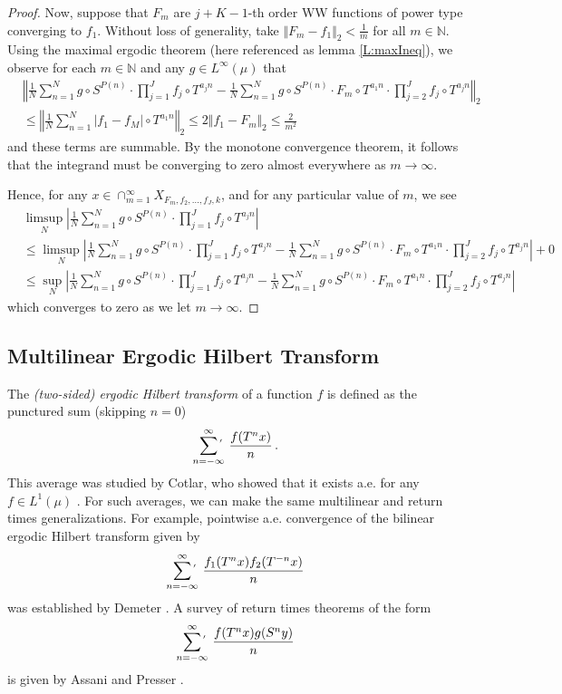 \documentclass[11pt, oneside]{amsart}   	%
\newcommand{\1}{\mathbbm{1}}
\newcommand{\N}{\mathbb{N}}
\theoremstyle{definition}
\begin{document}
\begin{proof}
Now, suppose that $F_m$ are $j+K-1$-th order WW functions of power type converging to $f_1$. Without loss of generality, take $\Vert F_m - f_1 \Vert_2< \frac{1}{m}$ for all $m\in \N$. Using the maximal ergodic theorem (here referenced as lemma \ref{L:maxIneq}), we observe for each $m\in \N$ and any $g \in L^\infty(\mu)$ that
\begin{align*}
&\left\Vert \frac{1}{N}\sum_{n=1}^N g\circ S^{P(n)} \cdot \prod_{j=1}^J f_j\circ T^{a_j n} - \frac{1}{N}\sum_{n=1}^N g\circ S^{P(n)} \cdot F_m \circ T^{a_1n} \cdot \prod_{j=2}^J f_j\circ T^{a_j n} \right\Vert_2 \\
&\leq \left\Vert \frac{1}{N}\sum_{n=1}^N \left| f_1 - f_M \right| \circ T^{a_1 n}  \right\Vert_2 \leq 2\Vert f_1 - F_m \Vert_2 \leq \frac{2}{m^2}
\end{align*}
and these terms are summable. By the monotone convergence theorem, it follows that the integrand must be converging to zero almost everywhere as $m\to \infty$.

Hence, for any $x\in \cap_{m=1}^\infty X_{F_m, f_2, \dots, f_J, k}$, and for any particular value of $m$, we see
\begin{align*}
&\limsup_N \left| \frac{1}{N}\sum_{n=1}^N g\circ S^{P(n)} \cdot \prod_{j=1}^J f_j\circ T^{a_j n}\right| \\
&\leq \limsup_N \left| \frac{1}{N}\sum_{n=1}^N g\circ S^{P(n)} \cdot \prod_{j=1}^J f_j\circ T^{a_j n} - \frac{1}{N}\sum_{n=1}^N g\circ S^{P(n)} \cdot F_m \circ T^{a_1n} \cdot \prod_{j=2}^J f_j\circ T^{a_j n} \right| + 0 \\
&\leq \sup_N \left| \frac{1}{N}\sum_{n=1}^N g\circ S^{P(n)} \cdot \prod_{j=1}^J f_j\circ T^{a_j n} - \frac{1}{N}\sum_{n=1}^N g\circ S^{P(n)} \cdot F_m \circ T^{a_1n} \cdot \prod_{j=2}^J f_j\circ T^{a_j n} \right| 
\end{align*}
which converges to zero as we let $m\to \infty$.
\end{proof}

\subsection{Multilinear Ergodic Hilbert Transform}\label{S:Hilb}

The \textit{(two-sided) ergodic Hilbert transform} of a function $f$ is defined as the punctured sum (skipping $n=0$)
$$\sum_{n=-\infty}^\infty\mathop{}^{\mkern-20mu '} \frac{f(T^n x)}{n} \, .$$
This average was studied by Cotlar, who showed that it exists a.e. for any $f\in L^1(\mu)$ \cite{Cotlar}. For such averages, we can make the same multilinear and return times generalizations. For example, pointwise a.e. convergence of the bilinear ergodic Hilbert transform given by 
$$\sum_{n=-\infty}^\infty\mathop{}^{\mkern-20mu '} \frac{f_1(T^n x)f_2(T^{-n}x)}{n}$$
was established by Demeter \cite{Demeter}. A survey of return times theorems of the form 
$$\sum_{n=-\infty}^\infty\mathop{}^{\mkern-20mu '} \frac{f(T^n x)g(S^{n}y)}{n}$$
is given by Assani and Presser \cite{AssaniPresser+2014+19+58}.
\end{document}

